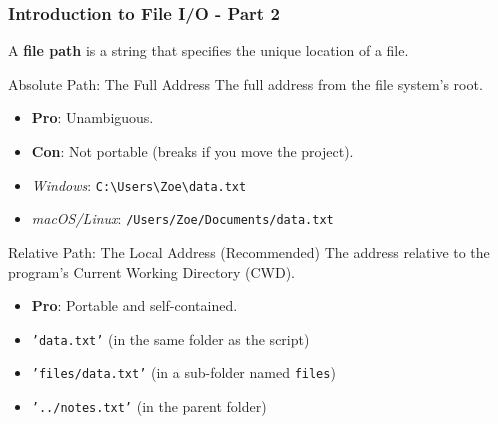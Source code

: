 \documentclass{beamer}
\begin{document}
\begin{frame}[fragile]
    \frametitle{Introduction to File I/O - Part 2}
    \subtitle{How Do We Find Files? The File Path}
    
    A \textbf{file path} is a string that specifies the unique location of a file.
    
    \begin{block}{Absolute Path: The Full Address}
        The full address from the file system's root.
        \begin{itemize}
            \item \textbf{Pro}: Unambiguous.
            \item \textbf{Con}: Not portable (breaks if you move the project).
            \item \textit{Windows}: \texttt{C:\textbackslash Users\textbackslash Zoe\textbackslash data.txt}
            \item \textit{macOS/Linux}: \texttt{/Users/Zoe/Documents/data.txt}
        \end{itemize}
    \end{block}
    
    \begin{block}{Relative Path: The Local Address (Recommended)}
        The address relative to the program's Current Working Directory (CWD).
        \begin{itemize}
            \item \textbf{Pro}: Portable and self-contained.
            \item \texttt{'data.txt'} (in the same folder as the script)
            \item \texttt{'files/data.txt'} (in a sub-folder named \texttt{files})
            \item \texttt{'../notes.txt'} (in the parent folder)
        \end{itemize}
    \end{block}
    
\end{frame}
\end{document}
